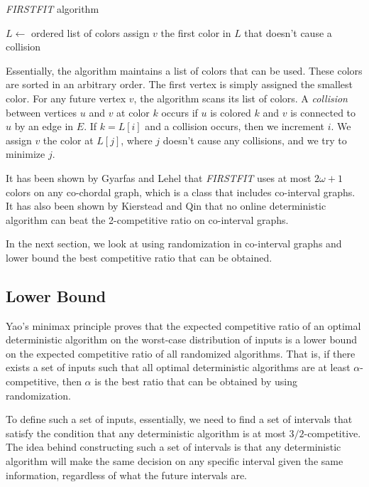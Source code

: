 \begin{algorithm}
\caption{\emph{FIRSTFIT} algorithm}
$L \leftarrow$ ordered list of colors\;
 {
  assign $v$ the first color in $L$ that doesn't cause a collision\;
}
\end{algorithm}

Essentially, the algorithm maintains a list of colors that can be used. These colors are sorted in an arbitrary order. The first vertex is simply assigned the smallest color. For any future vertex $v$, the algorithm scans its list of colors. A \emph{collision} between vertices $u$ and $v$ at color $k$ occurs if $u$ is colored $k$ and $v$ is connected to $u$ by an edge in $E$. If $k = L[i]$ and a collision occurs, then we increment $i$. We assign $v$ the color at $L[j]$, where $j$ doesn't cause any collisions, and we try to minimize $j$.

It has been shown by Gyarfas and Lehel \cite{gyarfas} that \emph{FIRSTFIT} uses at most $2\omega+1$ colors on any co-chordal graph, which is a class that includes co-interval graphs. It has also been shown by Kierstead and Qin \cite{kierstead} that no online deterministic algorithm can beat the 2-competitive ratio on co-interval graphs.

In the next section, we look at using randomization in co-interval graphs and lower bound the best competitive ratio that can be obtained.
\subsection{Lower Bound}
Yao's minimax principle proves that the expected competitive ratio of an optimal deterministic algorithm on the worst-case distribution of inputs is a lower bound on the expected competitive ratio of all randomized algorithms. That is, if there exists a set of inputs such that all optimal deterministic algorithms are at least $\alpha$-competitive, then $\alpha$ is the best ratio that can be obtained by using randomization.

To define such a set of inputs, essentially, we need to find a set of intervals that satisfy the condition that any deterministic algorithm is at most $3/2$-competitive. The idea behind constructing such a set of intervals is that any deterministic algorithm will make the same decision on any specific interval given the same information, regardless of what the future intervals are.

